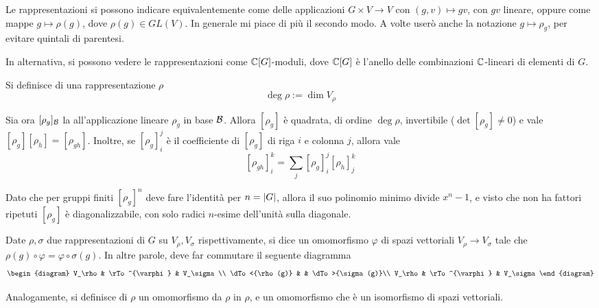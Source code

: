 \documentclass[a4paper,10pt,oneside]{math_article}
\renewcommand{\phi}{\varphi}
\begin{document}
    Le rappresentazioni si possono indicare equivalentemente come delle applicazioni $G \times V \rightarrow V$ con $(g,v)\mapsto gv$, con $gv$ lineare, oppure come mappe $g \mapsto \rho(g)$, dove $\rho(g) \in GL(V)$. In generale mi piace di più il secondo modo. A volte userò anche la notazione $g \mapsto \rho_g$, per evitare quintali di parentesi.
    
    In alternativa, si possono vedere le rappresentazioni come $\mathbb C[G]$-moduli, dove $\mathbb C[G]$ è l'anello delle combinazioni $\mathbb C$-lineari di elementi di $G$.
    
    \begin{mydef}
     Si definisce  di una rappresentazione $\rho$
     \[\deg \rho := \dim V_\rho\]
    \end{mydef}

    
    Sia ora $[\rho_g]_\mathcal B$ la  all'applicazione lineare $\rho_g$ in base $\mathcal B$. Allora $[\rho_g]$ è quadrata, di ordine $\deg \rho$, invertibile ($\det [\rho_g]\ne 0$) e vale $[\rho_g] [\rho_h]=[\rho_{gh}]$. Inoltre, se $[\rho_g]_i^j$ è il coefficiente di $[\rho_g]$ di riga $i$ e colonna $j$, allora vale
    \[
     [\rho_{gh}]_i^k=\sum_j [\rho_g]_i^j [\rho_h]_j^k
    \]

    Dato che per gruppi finiti $[\rho_g]^n$ deve fare l'identità per $n=\left|G\right|$, allora il suo polinomio minimo divide $x^n-1$, e visto che non ha fattori ripetuti $[\rho_g]$ è diagonalizzabile, con solo radici $n$-esime dell'unità sulla diagonale. 
    
    \begin{mydef}
      Date $\rho,\sigma$ due rappresentazioni di $G$ su $V_\rho,V_\sigma$ rispettivamente, si dice  un omomorfismo $\phi$ di spazi vettoriali $V_\rho \rightarrow V_\sigma$ tale che $\rho(g) \circ \phi = \phi \circ \sigma(g)$. 
      In altre parole, deve far commutare il seguente diagramma
      \[
       \begin{diagram}
	V_\rho         & \rTo^{\phi}  & V_\sigma\\
	\dTo<{\rho(g)} &           	 & \dTo>{\sigma(g)}\\
	V_\rho         & \rTo^{\phi}  & V_\sigma
       \end{diagram}
      \]
       
    Analogamente, si definisce  di $\rho$ un omomorfismo da $\rho$ in $\rho$, e  un omomorfismo che è un isomorfismo di spazi vettoriali.
    \end{mydef}
    
\end{document}
